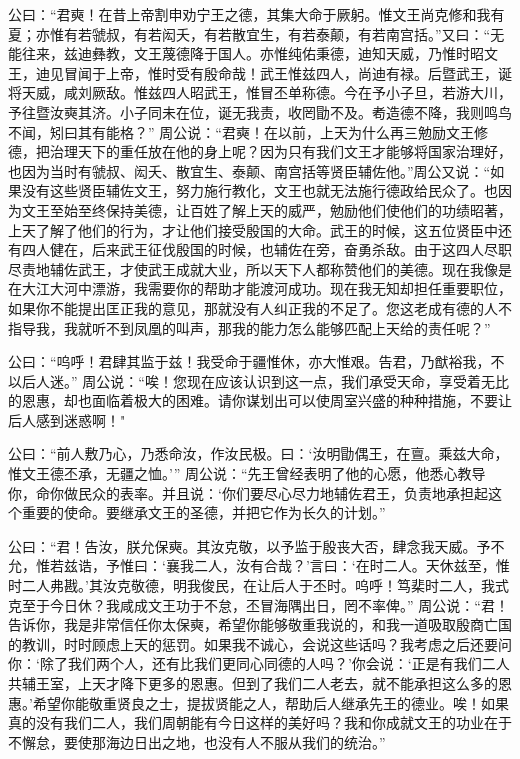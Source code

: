 \documentclass[12pt,UTF8]{ctexbook}
\begin{document}
公曰：“君奭！在昔上帝割申劝宁王之德，其集大命于厥躬。惟文王尚克修和我有夏；亦惟有若虢叔，有若闳夭，有若散宜生，有若泰颠，有若南宫括。”又曰：“无能往来，兹迪彝教，文王蔑德降于国人。亦惟纯佑秉德，迪知天威，乃惟时昭文王，迪见冒闻于上帝，惟时受有殷命哉！武王惟兹四人，尚迪有禄。后暨武王，诞将天威，咸刘厥敌。惟兹四人昭武王，惟冒丕单称德。今在予小子旦，若游大川，予往暨汝奭其济。小子同未在位，诞无我责，收罔勖不及。耇造德不降，我则鸣鸟不闻，矧曰其有能格？”
周公说：“君奭！在以前，上天为什么再三勉励文王修德，把治理天下的重任放在他的身上呢？因为只有我们文王才能够将国家治理好，也因为当时有虢叔、闳夭、散宜生、泰颠、南宫括等贤臣辅佐他。”周公又说：“如果没有这些贤臣辅佐文王，努力施行教化，文王也就无法施行德政给民众了。也因为文王至始至终保持美德，让百姓了解上天的威严，勉励他们使他们的功绩昭著，上天了解了他们的行为，才让他们接受殷国的大命。武王的时候，这五位贤臣中还有四人健在，后来武王征伐殷国的时候，也辅佐在旁，奋勇杀敌。由于这四人尽职尽责地辅佐武王，才使武王成就大业，所以天下人都称赞他们的美德。现在我像是在大江大河中漂游，我需要你的帮助才能渡河成功。现在我无知却担任重要职位，如果你不能提出匡正我的意见，那就没有人纠正我的不足了。您这老成有德的人不指导我，我就听不到凤凰的叫声，那我的能力怎么能够匹配上天给的责任呢？”

公曰：“呜呼！君肆其监于兹！我受命于疆惟休，亦大惟艰。告君，乃猷裕我，不以后人迷。”
周公说：“唉！您现在应该认识到这一点，我们承受天命，享受着无比的恩惠，却也面临着极大的困难。请你谋划出可以使周室兴盛的种种措施，不要让后人感到迷惑啊！"

公曰：“前人敷乃心，乃悉命汝，作汝民极。曰：‘汝明勖偶王，在亶。乘兹大命，惟文王德丕承，无疆之恤。’”
周公说：“先王曾经表明了他的心愿，他悉心教导你，命你做民众的表率。并且说：‘你们要尽心尽力地辅佐君王，负责地承担起这个重要的使命。要继承文王的圣德，并把它作为长久的计划。”

公曰：“君！告汝，朕允保奭。其汝克敬，以予监于殷丧大否，肆念我天威。予不允，惟若兹诰，予惟曰：‘襄我二人，汝有合哉？’言曰：‘在时二人。天休兹至，惟时二人弗戡。’其汝克敬德，明我俊民，在让后人于丕时。呜呼！笃棐时二人，我式克至于今日休？我咸成文王功于不怠，丕冒海隅出日，罔不率俾。”
周公说：“君！告诉你，我是非常信任你太保奭，希望你能够敬重我说的，和我一道吸取殷商亡国的教训，时时顾虑上天的惩罚。如果我不诚心，会说这些话吗？我考虑之后还要问你：‘除了我们两个人，还有比我们更同心同德的人吗？’你会说：‘正是有我们二人共辅王室，上天才降下更多的恩惠。但到了我们二人老去，就不能承担这么多的恩惠。’希望你能敬重贤良之士，提拔贤能之人，帮助后人继承先王的德业。唉！如果真的没有我们二人，我们周朝能有今日这样的美好吗？我和你成就文王的功业在于不懈怠，要使那海边日出之地，也没有人不服从我们的统治。”
\end{document}
